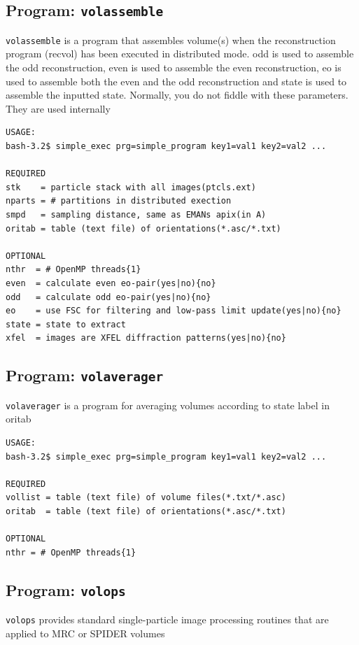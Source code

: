 \documentclass[a4paper,11pt]{article}
\newcommand{\prgname}[1]{\textcolor{NavyBlue}{\texttt{#1}}}
\begin{document}
\subsection{Program: \prgname{volassemble}}
\label{volassemble}
\prgname{volassemble} is a program that assembles volume(s) when the reconstruction program (recvol) has been executed in distributed mode. odd is used to assemble the odd reconstruction, even is used to assemble the even reconstruction, eo is used to assemble both the even and the odd reconstruction and state is used to assemble the inputted state. Normally, you do not fiddle with these parameters. They are used internally

\begin{verbatim}
USAGE:
bash-3.2$ simple_exec prg=simple_program key1=val1 key2=val2 ...

REQUIRED
stk    = particle stack with all images(ptcls.ext)
nparts = # partitions in distributed exection
smpd   = sampling distance, same as EMANs apix(in A)
oritab = table (text file) of orientations(*.asc/*.txt)

OPTIONAL
nthr  = # OpenMP threads{1}
even  = calculate even eo-pair(yes|no){no}
odd   = calculate odd eo-pair(yes|no){no}
eo    = use FSC for filtering and low-pass limit update(yes|no){no}
state = state to extract
xfel  = images are XFEL diffraction patterns(yes|no){no}
\end{verbatim}

\subsection{Program: \prgname{volaverager}}
\label{volaverager}
\prgname{volaverager} is a program for averaging volumes according to state label in oritab 

\begin{verbatim}
USAGE:
bash-3.2$ simple_exec prg=simple_program key1=val1 key2=val2 ...

REQUIRED
vollist = table (text file) of volume files(*.txt/*.asc)
oritab  = table (text file) of orientations(*.asc/*.txt)

OPTIONAL
nthr = # OpenMP threads{1}
\end{verbatim}

\subsection{Program: \prgname{volops}}
\label{volops}
\prgname{volops} provides standard single-particle image processing routines that are applied to MRC or SPIDER volumes 
\end{document}
